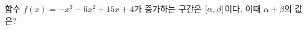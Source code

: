 함수 $f(x)=-x^3-6x^2+15x+4$가 증가하는 구간은 $[\alpha{,}\mkern3mu\mathopen{}\beta]$이다. 이때 $\alpha+\beta$의 값은?
